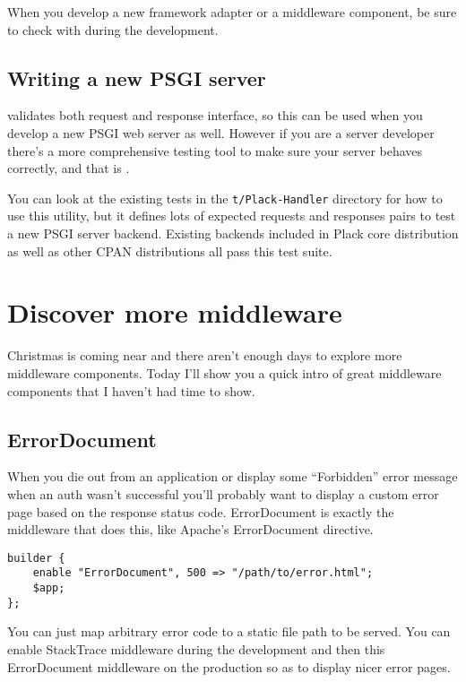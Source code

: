 When you develop a new framework adapter or a middleware component, be
sure to check with  during the development.

\section{Writing a new PSGI server}\label{writing-a-new-psgi-server}

 validates both request and response interface, so this
can be used when you develop a new PSGI web server as well. However if
you are a server developer there's a more comprehensive testing tool to
make sure your server behaves correctly, and that is .

You can look at the existing tests in the \lstinline!t/Plack-Handler!
directory for how to use this utility, but it defines lots of expected
requests and responses pairs to test a new PSGI server backend. Existing
 backends included in Plack core distribution as well as
other CPAN distributions all pass this test suite.

\chapter{Discover more
middleware}\label{day-22-discover-more-middleware}

Christmas is coming near and there aren't enough days to explore more
middleware components. Today I'll show you a quick intro of great
middleware components that I haven't had time to show.

\section{ErrorDocument}\label{errordocument}

When you die out from an application or display some ``Forbidden'' error
message when an auth wasn't successful you'll probably want to display a
custom error page based on the response status code. ErrorDocument is
exactly the middleware that does this, like Apache's ErrorDocument
directive.

\begin{lstlisting}
builder {
    enable "ErrorDocument", 500 => "/path/to/error.html";
    $app;
};
\end{lstlisting}

You can just map arbitrary error code to a static file path to be
served. You can enable StackTrace middleware during the development and
then this ErrorDocument middleware on the production so as to display
nicer error pages.

